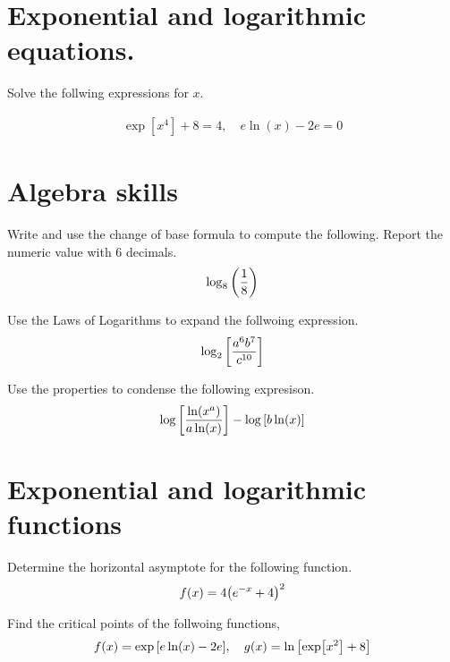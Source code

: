 \documentclass[main.tex]{subfiles}
\begin{document}
\section{Exponential and logarithmic equations.}
Solve the follwing expressions for $x$.

\begin{gather*}
    \exp[x^4]+8=4,\quad e\ln(x)-2e=0
\end{gather*}

\section{Algebra skills}

Write and use the change of base formula to compute the following. Report the numeric value with 6 decimals.
\begin{gather*}
    \log_8\qty(\frac{1}{8})
\end{gather*}

Use the Laws of Logarithms to expand the follwoing expression.
\[\log_2\qty[\frac{a^6b^7}{c^{10}}]\]

Use the properties to condense the following expresison.
\begin{gather*}
    \log\qty[\frac{\ln(x^a)}{a\ln(x)}]-\log\qty[b\ln(x)]
\end{gather*}

\section{Exponential and logarithmic functions}

Determine the horizontal asymptote for the following function.
\[f(x)=4\qty(e^{-x}+4)^2\]

Find the critical points of the follwoing functions,
\begin{gather*}
    f(x) = \exp\qty[e\ln(x)-2e], \quad
    g(x) = \ln\qty[\exp[x^2]+8]
\end{gather*}
\end{document}
